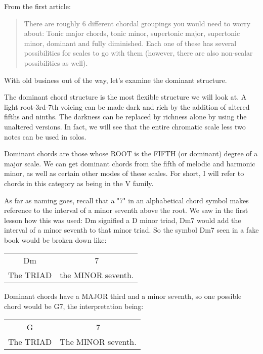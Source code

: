 From the first article:
\begin{quote}
There are roughly 6 different chordal groupings you would need to worry about:
Tonic major chords, tonic minor, supertonic major, supertonic minor, dominant
and fully diminished. Each one of these has several possibilities for scales
to go with them (however, there are also non-scalar possibilities as well).
\end{quote}

With old business out of the way, let's examine the dominant structure.

The dominant chord structure is the most flexible structure we will look at.
A light root-3rd-7th voicing can be made dark and rich by the addition of
altered fifths and ninths. The darkness can be replaced by richness alone by
using the unaltered versions. In fact, we will see that the entire chromatic
scale less two notes can be used in solos.

Dominant chords are those whose ROOT is the FIFTH (or dominant) degree of
a major scale. We can get dominant chords from the fifth of melodic and
harmonic minor, as well as certain other modes of these scales. For short,
I will refer to chords in this category as being in the V family.

As far as naming goes, recall that a "7" in an alphabetical chord symbol
makes reference to the interval of a minor seventh above the root. We saw
in the first lesson how this was used: Dm signified a D minor triad, Dm7
would add the interval of a minor seventh to that minor triad. So the
symbol Dm7 seen in a fake book would be broken down like: 

\begin{center}
\begin{tabular}{ c c }
  Dm          & 7\\
  The TRIAD   & the MINOR seventh.\\
\end{tabular}
\end{center}

Dominant chords have a MAJOR third and a minor seventh, so one possible
chord would be G7, the interpretation being:

\begin{center}
\begin{tabular}{ c c }
  G           & 7\\
  The TRIAD   & The MINOR seventh.\\
\end{tabular}
\end{center}


